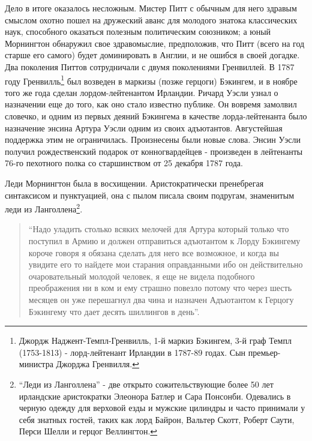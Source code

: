 \documentclass[
  oneside,
  12pt,
  titlepage]{book}
\begin{document}
Дело в итоге оказалось несложным. Мистер Питт с обычным для него здравым смыслом охотно пошел на дружеский аванс для молодого знатока классических наук, способного оказаться полезным политическим союзником; а юный Морнингтон обнаружил свое здравомыслие, предположив, что Питт (всего на год старше его самого) будет доминировать в Англии, и не ошибся в своей догадке. Два поколения Питтов сотрудничали с двумя поколениями Гренвиллей. В 1787 году Гренвилль\footnote{Джордж Наджент-Темпл-Гренвилль, 1-й маркиз Бэкингем, 3-й граф Темпл (1753-1813) - лорд-лейтенант Ирландии в 1787-89 годах. Сын премьер-министра Джорджа Гренвилля.} был возведен в маркизы (позже герцоги) Бэкингем, и в ноябре того же года сделан лордом-лейтенантом Ирландии. Ричард Уэсли узнал о назначении еще до того, как оно стало известно публике. Он вовремя замолвил словечко, и одним из первых деяний Бэкингема в качестве лорда-лейтенанта было назначение энсина Артура Уэсли одним из своих адъютантов. Августейшая поддержка этим не ограничилась. Произнесены были новые слова. Энсин Уэсли получил рождественский подарок от конногвардейцев - произведен в лейтенанты 76-го пехотного полка со старшинством от 25 декабря 1787 года.

Леди Морнингтон была в восхищении. Аристократически пренебрегая синтаксисом и пунктуацией, она с пылом писала своим подругам, знаменитым леди из Ланголлена\footnote{``Леди из Ланголлена'' - две открыто сожительствующие более 50 лет ирландские аристократки Элеонора Батлер и Сара Понсонби. Одевались в черную одежду для верховой езды и мужские цилиндры и часто принимали у себя знатных гостей, таких как лорд Байрон, Вальтер Скотт, Роберт Саути, Перси Шелли и герцог Веллингтон.}.

\begin{quote}
``Надо уладить столько всяких мелочей для Артура который только что поступил в Армию и должен отправиться адъютантом к Лорду Бэкингему короче говоря я обязана сделать для него все возможное, и когда вы увидите его то найдете мои старания оправданными ибо он действительно очаровательный молодой человек, я еще не видела подобного преображения ни в ком и ему страшно повезло потому что через шесть месяцев он уже перешагнул два чина и назначен Адъютантом к Герцогу Бэкингему что дает десять шиллингов в день''.
\end{quote}
\end{document}
